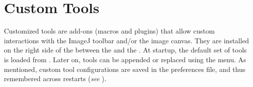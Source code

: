 \renewenvironment{lyxlist}[1]{%
  \begin{list}{}{%
    \settowidth{\labelwidth}{#1}
    \setlength{\leftmargin}{\labelwidth}
    \addtolength{\leftmargin}{\labelsep}
    \renewcommand{\makelabel}[1]{##1\hfil}
  }%
}{\end{list}}



\section{\noindent Custom Tools\label{sec:CustomToolsAndToolsets}}

Customized tools are add-ons (macros and plugins) that allow custom
interactions with the ImageJ toolbar and/or the image canvas. They
are installed on the right side of the  between
the  and the .
At startup, the default set of tools is loaded from .
Later on, tools can be appended or replaced using the 
menu. As mentioned, custom tool configurations are saved in the preferences
file, and thus remembered across restarts (\emph{see} ).

